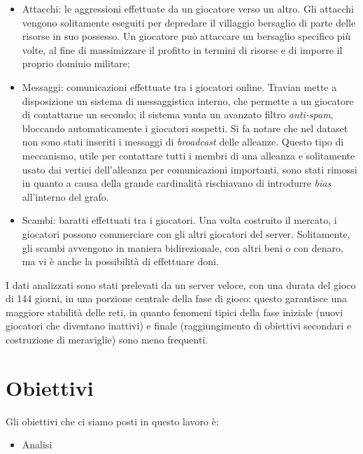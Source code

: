 \begin{itemize}
	\item Attacchi: le aggressioni effettuate da un giocatore verso un altro. Gli attacchi vengono solitamente eseguiti per depredare il villaggio bersaglio di parte delle risorse in suo possesso. Un giocatore può attaccare un bersaglio specifico più volte, al fine di massimizzare il profitto in termini di risorse e di imporre il proprio dominio militare;
	\item Messaggi: comunicazioni effettuate tra i giocatori online. Travian mette a disposizione un sistema di messaggistica interno, che permette a un giocatore di contattarne un secondo; il sistema vanta un avanzato filtro \textit{anti-spam}, bloccando automaticamente i giocatori sospetti.
	Si fa notare che nel dataset non sono stati inseriti i messaggi di \textit{broadcast} delle alleanze. Questo tipo di meccanismo, utile per contattare tutti i membri di una alleanza e solitamente usato dai vertici dell'alleanza per comunicazioni importanti, sono stati rimossi in quanto a causa della grande cardinalità rischiavano di introdurre \textit{bias} all'interno del grafo.
	\item Scambi: baratti effettuati tra i giocatori. Una volta costruito il mercato, i giocatori possono commerciare con gli altri giocatori del server. Solitamente, gli scambi avvengono in maniera bidirezionale, con altri beni o con denaro, ma vi è anche la possibilità di effettuare doni.
\end{itemize}
I dati analizzati sono stati prelevati da un server veloce, con una durata del gioco di 144 giorni, in una porzione centrale della fase di gioco: questo garantisce una maggiore stabilità delle reti, in quanto fenomeni tipici della fase iniziale (nuovi giocatori che diventano inattivi) e finale (raggiungimento di obiettivi secondari e costruzione di meraviglie) sono meno frequenti.

\section{Obiettivi}
Gli obiettivi che ci siamo posti in questo lavoro è:
\begin{itemize}
	\item Analisi
\end{itemize}